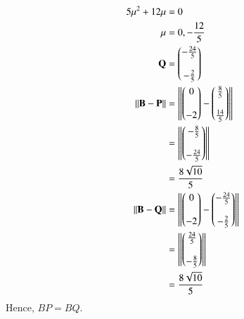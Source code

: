 \documentclass[journal,12pt,twocolumn]{IEEEtran}
\begin{document}
\begin{enumerate}
\begin{align}
5\mu^2 + 12 \mu &=0\\
\mu &= 0, -\frac{12}{5}\\
\mathbf{Q} &= \begin{pmatrix}-\frac{24}{5}\\\\-\frac{2}{5}\end{pmatrix}\\
\left\lVert\mathbf{B}-\mathbf{P}\right\rVert &= \left\lVert\begin{pmatrix}0\\\\-2\end{pmatrix} - \begin{pmatrix}\frac{8}{5}\\\\ \frac{14}{5}\end{pmatrix}\right\rVert\\
&= \left\lVert\begin{pmatrix}-\frac{8}{5}\\\\-\frac{24}{5}\end{pmatrix}\right\rVert\\
&= \frac{8\sqrt{10}}{5}\\
\left\lVert\mathbf{B}-\mathbf{Q}\right\rVert &= \left\lVert\begin{pmatrix}0\\\\-2\end{pmatrix} - \begin{pmatrix}-\frac{24}{5}\\\\-\frac{2}{5}\end{pmatrix}\right\rVert\\
&= \left\lVert\begin{pmatrix}\frac{24}{5}\\\\-\frac{8}{5}\end{pmatrix}\right\rVert\\
&= \frac{8\sqrt{10}}{5}
\end{align}
Hence, $BP = BQ$.
\end{enumerate}
\end{document}
